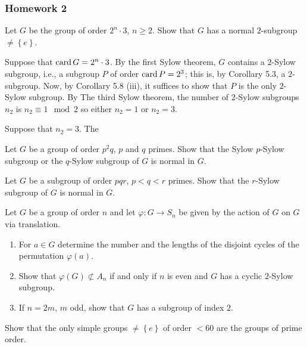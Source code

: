 \subsubsection{Homework 2}
\setcounter{exercise}{0}
\setcounter{equation}{0}

\begin{problem}
  Let \(G\) be the group of order \(2^n\cdot 3\), \(n\geq 2\). Show that
  \(G\) has a normal \(2\)-subgroup \(\neq\left\{e\right\}\).
\end{problem}
\begin{solution}
  Suppose that \(\operatorname{card} G=2^n\cdot 3\). By the first Sylow theorem, \(G\)
  contains a \(2\)-Sylow subgroup, i.e., a subgroup \(P\) of order
  \(\operatorname{card} P=2^3\); this is, by Corollary 5.3, a \(2\)-subgroup. Now, by
  Corollary 5.8 (iii), it suffices to show that \(P\) is the only
  \(2\)-Sylow subgroup. By The third Sylow theorem, the number of
  \(2\)-Sylow subgroups \(n_2\) is \(n_2\equiv 1\mod 2\) so either
  \(n_2=1\) or \(n_2=3\).

  Suppose that \(n_2=3\). The
\end{solution}

\begin{problem}
  Let \(G\) be a group of order \(p^2q\), \(p\) and \(q\) primes. Show that
  the Sylow \(p\)-Sylow subgroup or the \(q\)-Sylow subgroup of \(G\) is
  normal in \(G\).
\end{problem}
\begin{solution}
\end{solution}

\begin{problem}
  Let \(G\) be a subgroup of order \(pqr\), \(p<q<r\) primes. Show that the
  \(r\)-Sylow subgroup of \(G\) is normal in \(G\).
\end{problem}
\begin{solution}
\end{solution}

\begin{problem}
  Let \(G\) be a group of order \(n\) and let \(\varphi\colon G\to S_n\) be
  given by the action of \(G\) on \(G\) via translation.
  \begin{enumerate}[label=(\alph*),noitemsep]
  \item For \(a\in G\) determine the number and the lengths of the disjoint
    cycles of the permutation \(\varphi(a)\).
  \item Show that \(\varphi(G)\nsubset A_n\) if and only if \(n\) is even
    and \(G\) has a cyclic \(2\)-Sylow subgroup.
  \item If \(n=2m\), \(m\) odd, show that \(G\) has a subgroup of index
    \(2\).
  \end{enumerate}
\end{problem}
\begin{solution}
\end{solution}

\begin{problem}
  Show that the only simple groups \(\neq\left\{e\right\}\) of order
  \(<60\) are the groups of prime order.
\end{problem}
\begin{solution}
\end{solution}

